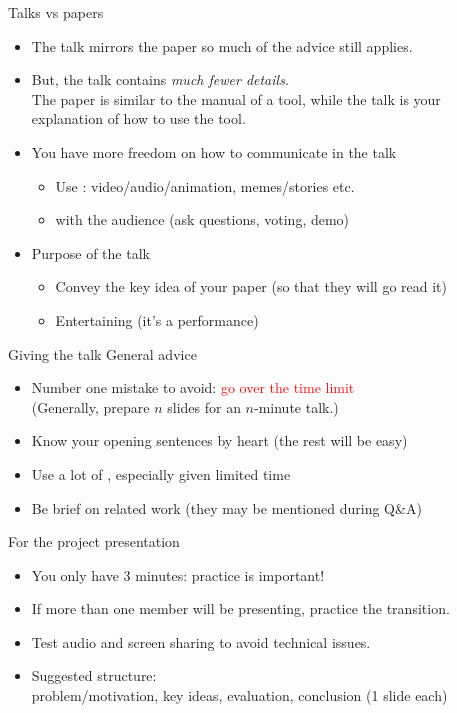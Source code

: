 \documentclass[usenames,dvipsnames,11pt,aspectratio=169]{beamer}
\begin{document}
\begin{frame}
    {Talks vs papers}
    \begin{itemize}
        \item The talk mirrors the paper so much of the advice still applies.
        \item But, the talk contains \emph{much fewer details}.\\
            The paper is similar to the manual of a tool,
            while the talk is your explanation of how to use the tool.
        \item You have more freedom on how to communicate in the talk
            \begin{itemize}
                \item Use : video/audio/animation, memes/stories etc.
                \item {} with the audience (ask questions, voting, demo)
            \end{itemize}
        \item Purpose of the talk
        \begin{itemize}
            \item Convey the key idea of your paper (so that they will go read it)
            \item Entertaining (it's a performance)
        \end{itemize}
    \end{itemize}
\end{frame}

\begin{frame}
    {Giving the talk}
    General advice\\
    \begin{itemize}
        \item Number one mistake to avoid: \textcolor{red}{go over the time limit}\\
            (Generally, prepare $n$ slides for an $n$-minute talk.)
        \item Know your opening sentences by heart (the rest will be easy)
        \item Use a lot of , especially given limited time
        \item Be brief on related work (they may be mentioned during Q\&A)
    \end{itemize}
    For the project presentation\\
    \begin{itemize}
        \item You only have 3 minutes: practice is important!  
        \item If more than one member will be presenting, practice the transition.
        \item Test audio and screen sharing to avoid technical issues.
        \item Suggested structure:\\
            problem/motivation, key ideas, evaluation, conclusion (1 slide each)
    \end{itemize}
\end{frame}
\end{document}
